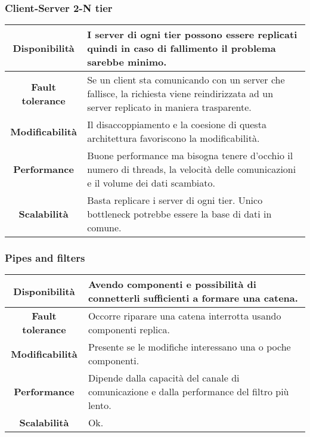 \subsubsection{Client-Server 2-N tier}
\begin{table}[!h]
	\centering
	\begin{tabular}{|c|p{10cm}|}
		\hline
		\textbf{Disponibilità} & I server di ogni tier possono essere replicati quindi in caso di fallimento il problema sarebbe minimo.\\
		\hline
		\textbf{Fault tolerance}&Se un client sta comunicando con un server che fallisce, la richiesta viene reindirizzata ad un server replicato in maniera trasparente. \\
		\hline
		\textbf{Modificabilità} & Il disaccoppiamento e la coesione di questa architettura favoriscono la modificabilità.\\
		\hline
		\textbf{Performance} & Buone performance ma bisogna tenere d'occhio il numero di threads, la velocità delle comunicazioni e il volume dei dati scambiato.\\
		\hline
		\textbf{Scalabilità} & Basta replicare i server di ogni tier. Unico bottleneck potrebbe essere la base di dati in comune.\\
		\hline
	\end{tabular}
\end{table}

\subsubsection{Pipes and filters}
\begin{table}[!h]
	\centering
	\begin{tabular}{|c|p{10cm}|}
		\hline
		\textbf{Disponibilità} & Avendo componenti e possibilità di connetterli sufficienti a formare una catena.\\
		\hline
		\textbf{Fault tolerance}&Occorre riparare una catena interrotta usando componenti replica. \\
		\hline
		\textbf{Modificabilità} & Presente se le modifiche interessano una o poche componenti.\\
		\hline
		\textbf{Performance} & Dipende dalla capacità del canale di comunicazione e dalla performance del filtro più lento.\\
		\hline
		\textbf{Scalabilità} & Ok.\\
		\hline
	\end{tabular}
\end{table}

